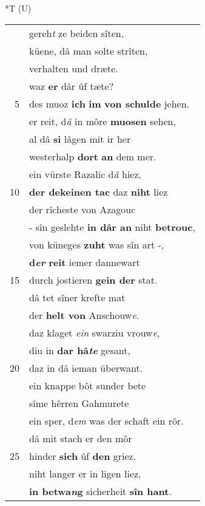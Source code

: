 \documentclass[8pt,a4paper,notitlepage]{article}
\begin{document}
\begin{table}[ht]
\begin{minipage}[t]{0.5\linewidth}
\end{minipage}
\hspace{0.5cm}
\begin{minipage}[t]{0.5\linewidth}
\small
\begin{center}*T (U)
\end{center}
\begin{tabular}{rl}
 & gereh\textit{t} ze beiden sîten,\\ 
 & küene, dâ man solte strîten,\\ 
 & verhalten und dræte.\\ 
 & waz \textbf{er} dâr ûf tæte?\\ 
5 & des muoz \textbf{ich} \textbf{im} \textbf{von schulde} jehen.\\ 
 & er reit, d\textit{â} in môre \textbf{muosen} sehen,\\ 
 & al dâ \textbf{si} lâgen mit ir her\\ 
 & westerhalp \textbf{dort} \textbf{an} dem mer.\\ 
 & ein vürste Razalic d\textit{â} hiez,\\ 
10 & \textbf{der dekeinen tac} daz \textbf{niht} liez\\ 
 & der rîcheste von Azagouc\\ 
 & - sîn geslehte \textbf{in dâr an} niht \textbf{betrouc},\\ 
 & von küneges \textbf{zuht} was sîn art -,\\ 
 & \textbf{d\textit{er}} \textbf{reit} iemer dannewart\\ 
15 & durch jostieren \textbf{gein der} stat.\\ 
 & dâ tet sîner krefte mat\\ 
 & der \textbf{helt von} Anschouw\textit{e}.\\ 
 & daz klaget \textit{ein} swarziu vrouw\textit{e},\\ 
 & diu in \textbf{dar hâ\textit{te}} gesant,\\ 
20 & daz in dâ ieman überwant.\\ 
 & ein knappe bôt sunder bete\\ 
 & sîme hêrren Gahmurete\\ 
 & ein sper, d\textit{em} was der schaft ein rôr.\\ 
 & dâ mit stach er den môr\\ 
25 & hinder \textbf{sich} ûf \textbf{den} griez.\\ 
 & niht langer er in ligen liez,\\ 
 & \textbf{in betwa\textit{n}g} sicherheit \textbf{sîn hant}.\\ 

\end{tabular}
\end{minipage}
\end{table}
\end{document}
